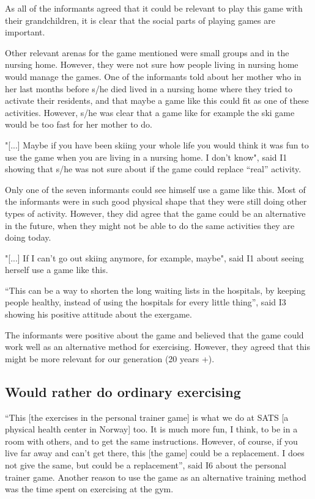 As all of the informants agreed that it could be relevant to play this game with their grandchildren, it is clear that the social parts of playing games are important. 

Other relevant arenas for the game mentioned were small groups and in the nursing home. However, they were not sure how people living in nursing home would manage the games. One of the informants told about her mother who in her last months before s/he died lived in a nursing home where they tried to activate their residents, and that maybe a game like this could fit as one of these activities. However, s/he was clear that a  game like for example the ski game would be too fast for her mother to do. 

"[...] Maybe if you have been skiing your whole life you would think it was fun to use the game when you are living in a nursing home. I don't know", said I1 showing that s/he was not sure about if the game could replace “real” activity. 

Only one of the seven informants could see himself use a game like this. Most of the informants were in such good physical shape that they were still doing other types of activity. However, they did agree that the game could be an alternative in the future, when they might not be able to do the same activities they are doing today. 

"[...] If I can't go out skiing anymore, for example, maybe", said I1 about seeing herself use a game like this. 

“This can be a way to shorten the long waiting lists in the hospitals, by keeping people healthy, instead of using the hospitals for every little thing”, said I3 showing his positive attitude about the exergame. 

The informants were positive about the game and believed that the game could work well as an alternative method for exercising. However, they agreed that this might be more relevant for our generation (20 years +). 

\subsection{Would rather do ordinary exercising}
“This [the exercises in the personal trainer game] is what we do at SATS [a physical health center in Norway] too. It is much more fun, I think, to be in a room with others, and to get the same instructions. However, of course, if you live far away and can't get there, this [the game] could be a replacement. I does not give the same, but could be a replacement”, said I6 about the personal trainer game. Another reason to use the game as an alternative training method was the time spent on exercising at the gym.

